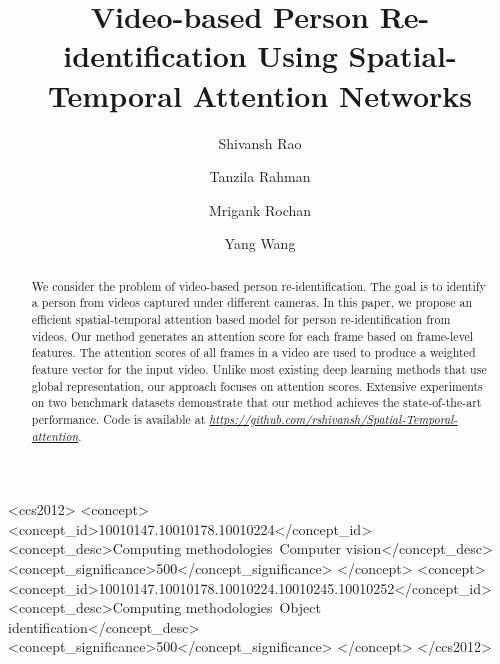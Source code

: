 \documentclass[sigconf, authordraft,review=false]{acmart}
\begin{document}
\title{Video-based Person Re-identification Using Spatial-Temporal Attention Networks}



\author{Shivansh Rao}

\author{Tanzila Rahman}

\author{Mrigank Rochan}

\author{Yang Wang}


\begin{abstract}
We consider the problem of video-based person re-identification. The goal is to identify a person from videos captured under different cameras. In this paper, we propose an efficient spatial-temporal attention based model for person re-identification from  videos. Our  method  generates  an  attention  score for each frame based on frame-level features. The attention scores of all frames in a video are used to produce a weighted feature vector for the input video. Unlike most existing deep learning methods that use global representation, our approach focuses on attention scores. Extensive experiments on two benchmark datasets demonstrate that our method achieves the state-of-the-art performance. Code is available at \textit{\textcolor{red}{\url{https://github.com/rshivansh/Spatial-Temporal-attention}}}.
\end{abstract}



\begin{CCSXML}
<ccs2012>
<concept>
<concept_id>10010147.10010178.10010224</concept_id>
<concept_desc>Computing methodologies~Computer vision</concept_desc>
<concept_significance>500</concept_significance>
</concept>
<concept>
<concept_id>10010147.10010178.10010224.10010245.10010252</concept_id>
<concept_desc>Computing methodologies~Object identification</concept_desc>
<concept_significance>500</concept_significance>
</concept>
</ccs2012>
\end{CCSXML}

\end{document}

